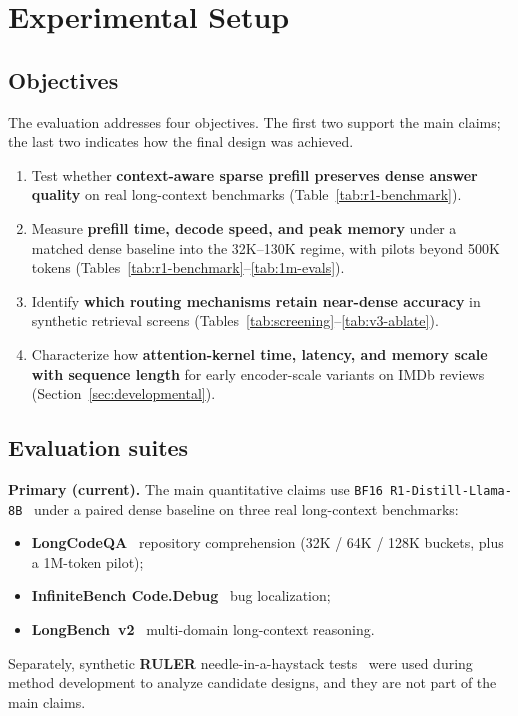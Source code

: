 \documentclass[11pt]{article}
\begin{document}
\section{Experimental Setup}
\label{sec:setup}

\subsection{Objectives}
\label{sec:objectives}

The evaluation addresses four objectives. The first two support the main
claims; the last two indicates how the final design was achieved.
\begin{enumerate}
  \item Test whether \textbf{context-aware sparse prefill preserves dense answer
    quality} on real long-context benchmarks (Table~\ref{tab:r1-benchmark}).
  \item Measure \textbf{prefill time, decode speed, and peak memory} under a matched
    dense baseline into the 32K--130K regime, with pilots beyond 500K tokens
    (Tables~\ref{tab:r1-benchmark}--\ref{tab:1m-evals}).
  \item Identify \textbf{which routing mechanisms retain near-dense accuracy} in
    synthetic retrieval screens
    (Tables~\ref{tab:screening}--\ref{tab:v3-ablate}).
  \item Characterize how \textbf{attention-kernel time, latency, and memory scale
    with sequence length} for early encoder-scale variants on IMDb reviews
    (Section~\ref{sec:developmental}).
\end{enumerate}

\subsection{Evaluation suites}
\label{sec:dataset}

\textbf{Primary (current).} The main quantitative claims use \texttt{BF16
R1-Distill-Llama-8B}~\citep{Guo_2025} under a paired dense baseline on three
real long-context benchmarks:
\begin{itemize}
  \item \textbf{LongCodeQA}~\citep{rando2025longcodebenchevaluatingcodingllms}
    repository comprehension (32K / 64K / 128K buckets, plus a 1M-token pilot);
  \item \textbf{InfiniteBench Code.Debug}~\citep{zhang-etal-2024-bench} bug
    localization;
  \item \textbf{LongBench~v2}~\citep{bai-etal-2025-longbench} multi-domain
    long-context reasoning.
\end{itemize}
Separately, synthetic \textbf{RULER} needle-in-a-haystack
tests~\citep{hsieh2024ruler} were used during method development to analyze
candidate designs, and they are not part of the main claims.
\end{document}
